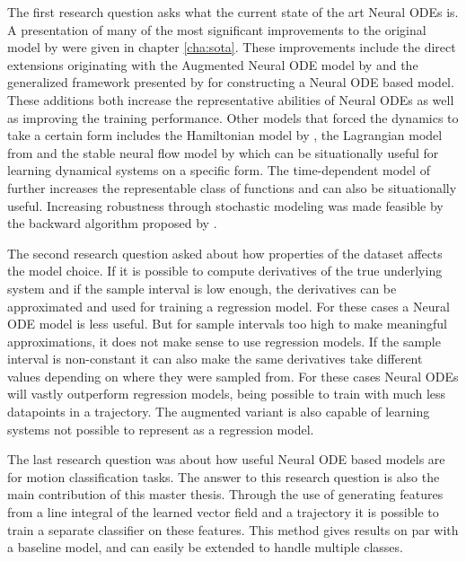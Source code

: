 \documentclass[12pt,a4paper]{book}
\begin{document}
The first research question asks what the current state of the art Neural ODEs is. A presentation of many of the most significant improvements to the original model by \cite{node} were given in chapter \ref{cha:sota}. These improvements include the direct extensions originating with the Augmented Neural ODE model by \cite{dupont2019augmented} and the generalized framework presented by \cite{massaroli2021dissecting} for constructing a Neural ODE based model. These additions both increase the representative abilities of Neural ODEs as well as improving the training performance. Other models that forced the dynamics to take a certain form includes the Hamiltonian model by \cite{hamiltoniannode}, the Lagrangian model from \cite{lagrangiannode} and the stable neural flow model by \cite{stableneuralflows} which can be situationally useful for learning dynamical systems on a specific form. The time-dependent model of \cite{timedependencenode} further increases the representable class of functions and can also be situationally useful. Increasing robustness through stochastic modeling was made feasible by the backward algorithm proposed by \cite{sdegradients}.

The second research question asked about how properties of the dataset affects the model choice. If it is possible to compute derivatives of the true underlying system and if the sample interval is low enough, the derivatives can be approximated and used for training a regression model. For these cases a Neural ODE model is less useful. But for sample intervals too high to make meaningful approximations, it does not make sense to use regression models. If the sample interval is non-constant it can also make the same derivatives take different values depending on where they were sampled from. For these cases Neural ODEs will vastly outperform regression models, being possible to train with much less datapoints in a trajectory. The augmented variant is also capable of learning systems not possible to represent as a regression model.

The last research question was about how useful Neural ODE based models are for motion classification tasks. The answer to this research question is also the main contribution of this master thesis. Through the use of generating features from a line integral of the learned vector field and a trajectory it is possible to train a separate classifier on these features. This method gives results on par with a baseline model, and can easily be extended to handle multiple classes.
\end{document}
